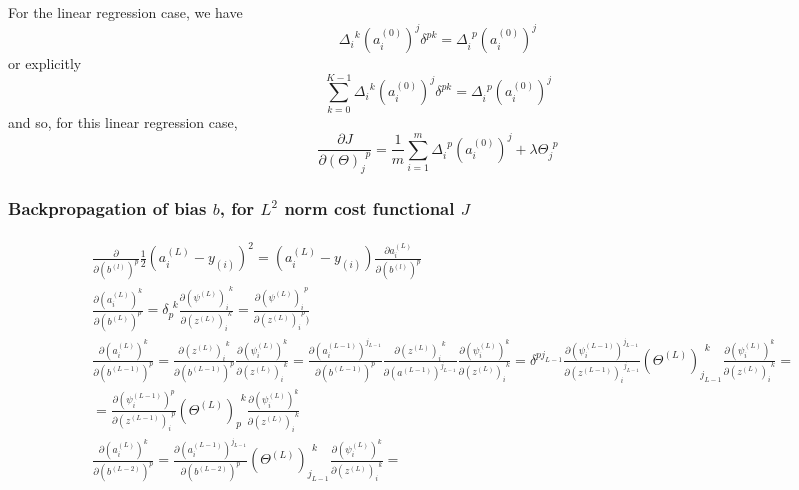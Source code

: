 \documentclass[10pt]{amsart}
\begin{document}
\begin{multicols*}{2}
For the linear regression case, we have
\[
\Delta_i^{\  \  k} (a_i^{(0)})^j \delta^{pk} = \Delta_i^{\  \  p} (a_i^{(0)})^j 
\]
or explicitly 
\[
\sum_{k=0}^{K-1} \Delta_i^{\  \  k} (a_i^{(0)})^j \delta^{pk} = \Delta_i^{\  \  p} (a_i^{(0)})^j
\]
and so, for this linear regression case,  
\begin{equation}
\frac{ \partial J}{ \partial ( \Theta)_j^{\  \  p}} = \frac{1}{m} \sum_{i=1}^m \Delta_i^{\  \  p} (a_i^{(0)})^j + \lambda \Theta_j^{\  \  p}
\end{equation}

\subsubsection{Backpropagation of bias $b$, for $L^2$ norm cost functional $J$}

\[
\begin{gathered}
\begin{aligned}
& \frac{ \partial }{ \partial (b^{(l)})^p} \frac{1}{2} (a_i^{(L)} - y_{(i)})^2 = (a_i^{(L)} - y_{(i)} ) \frac{ \partial a_i^{(L)} }{ \partial (b^{(l)})^p } \\
& \frac{ \partial ( a_i^{(L)})^k }{ \partial (b^{(L)})^p}  = \delta_p^{\  \  k} \frac{ \partial ( \psi^{(L)})_i^{\  \  k} }{ \partial (z^{(L)})_i^{\  \  k} } = \frac{ \partial ( \psi^{(L)})_i^{\  \  p} }{ \partial (z^{(L)})_i^{\  \  p})}  \\
 & \frac{ \partial ( a_i^{(L)})^k }{ \partial (b^{(L-1)})^p} = \frac{ \partial (z^{(L)})_i^{\  \  k} }{ \partial ( b^{(L-1)})^p} \frac{\partial (\psi^{(L)}_i)^k }{ \partial (z^{(L)})_i^{\  \  k} } = \frac{ \partial (a_i^{(L-1)})^{j_{L-1}} }{ \partial (b^{(L-1)})^p }  \frac{ \partial (z^{(L)})_i^{\  \  k} }{ \partial ( a^{(L-1)})^{j_{L-1}}  }\frac{\partial (\psi^{(L)}_i)^k }{ \partial (z^{(L)})_i^{\  \  k} }  =  \delta^{p j_{L-1}} \frac{ \partial ( \psi_i^{(L-1)})^{j_{L-1}} }{ \partial (z^{(L-1)})_i^{\  \  j_{L-1} } }  ( \Theta^{(L)})_{j_{L-1}}^{\  \  k}   \frac{\partial (\psi^{(L)}_i)^k }{ \partial (z^{(L)})_i^{\  \  k} } = \\
 & = \frac{ \partial ( \psi_i^{(L-1)})^{ p } }{ \partial (z^{(L-1)})_i^{\  \  p } }  ( \Theta^{(L)})_{ p }^{\  \  k}   \frac{\partial (\psi^{(L)}_i)^k }{ \partial (z^{(L)})_i^{\  \  k} }   \\
& \frac{ \partial ( a_i^{(L)})^k }{ \partial (b^{(L-2)})^p} = \frac{ \partial (a_i^{(L-1)})^{j_{L-1}} }{ \partial (b^{(L-2)})^p }  (\Theta^{(L)})_{j_{L-1}}^{\  \  k}  \frac{\partial (\psi^{(L)}_i)^k }{ \partial (z^{(L)})_i^{\  \  k} }  = \\

\end{aligned}
\end{gathered}\]
\end{multicols*}
\end{document}
